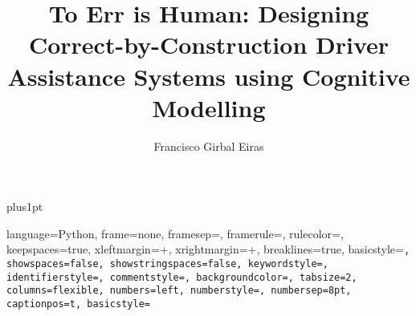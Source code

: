 \documentclass[12pt]{ociamthesis}  %
\title{To Err is Human: Designing Correct-by-Construction Driver Assistance Systems using Cognitive Modelling}
\author{Francisco Girbal Eiras}             %
\theoremstyle{definition}
\theoremstyle{definition}
\begin{document}
\baselineskip=18pt plus1pt
\setlength{\parindent}{0em}
\setlength{\parskip}{1em}

\setcounter{secnumdepth}{3}
\setcounter{tocdepth}{3}

\newcommand{\red}[1]{\textcolor{red}{#1}}

{\setlength{\parskip}{0em} \maketitle}                  %

\begin{romanpages}          %
{\setlength{\parskip}{1pt} \tableofcontents }            %
\end{romanpages}            %









\renewcommand{\lstlistingname}{File}

\lstset
{
    language={Python},
    frame=none,
    framesep=\fboxsep,
    framerule=\fboxrule,
    rulecolor=\color{gray},
    keepspaces=true,
    xleftmargin=\dimexpr\fboxsep+\fboxrule,
    xrightmargin=\dimexpr\fboxsep+\fboxrule,
    breaklines=true,
    basicstyle=\small\tt,
    showspaces=false,
    showstringspaces=false,
    keywordstyle=\color{blue}\sf,
    identifierstyle=\color{black},
    commentstyle=\color{cyan},
    backgroundcolor=\color{white},
    tabsize=2,
    columns=flexible,
    numbers=left, 
    numberstyle=\tiny\color{mygray}, 
    numbersep=8pt,
    captionpos=t,
    basicstyle=\fontsize{10}{11}\sffamily
}

\appendix
%
%
%


\end{document}
